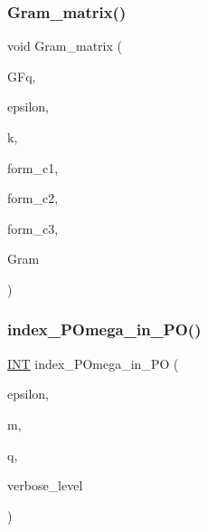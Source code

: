 \subsubsection{\texorpdfstring{Gram\+\_\+matrix()}{Gram\_matrix()}}
{\footnotesize\ttfamily void Gram\+\_\+matrix (\begin{DoxyParamCaption}\item[{\mbox{\hyperlink{classfinite__field}{finite\+\_\+field}} \&}]{G\+Fq,  }\item[{\mbox{\hyperlink{galois_8h_a09fddde158a3a20bd2dcadb609de11dc}{I\+NT}}}]{epsilon,  }\item[{\mbox{\hyperlink{galois_8h_a09fddde158a3a20bd2dcadb609de11dc}{I\+NT}}}]{k,  }\item[{\mbox{\hyperlink{galois_8h_a09fddde158a3a20bd2dcadb609de11dc}{I\+NT}}}]{form\+\_\+c1,  }\item[{\mbox{\hyperlink{galois_8h_a09fddde158a3a20bd2dcadb609de11dc}{I\+NT}}}]{form\+\_\+c2,  }\item[{\mbox{\hyperlink{galois_8h_a09fddde158a3a20bd2dcadb609de11dc}{I\+NT}}}]{form\+\_\+c3,  }\item[{\mbox{\hyperlink{galois_8h_a09fddde158a3a20bd2dcadb609de11dc}{I\+NT}} $\ast$\&}]{Gram }\end{DoxyParamCaption})}

\mbox{\label{_l_i_b_2_g_a_l_o_i_s_2orthogonal__points_8_c_a6c709045bebaefd9938058edb4d87c93}} 
\subsubsection{\texorpdfstring{index\+\_\+\+P\+Omega\+\_\+in\+\_\+\+P\+O()}{index\_POmega\_in\_PO()}}
{\footnotesize\ttfamily \mbox{\hyperlink{galois_8h_a09fddde158a3a20bd2dcadb609de11dc}{I\+NT}} index\+\_\+\+P\+Omega\+\_\+in\+\_\+\+PO (\begin{DoxyParamCaption}\item[{\mbox{\hyperlink{galois_8h_a09fddde158a3a20bd2dcadb609de11dc}{I\+NT}}}]{epsilon,  }\item[{\mbox{\hyperlink{galois_8h_a09fddde158a3a20bd2dcadb609de11dc}{I\+NT}}}]{m,  }\item[{\mbox{\hyperlink{galois_8h_a09fddde158a3a20bd2dcadb609de11dc}{I\+NT}}}]{q,  }\item[{\mbox{\hyperlink{galois_8h_a09fddde158a3a20bd2dcadb609de11dc}{I\+NT}}}]{verbose\+\_\+level }\end{DoxyParamCaption})}

